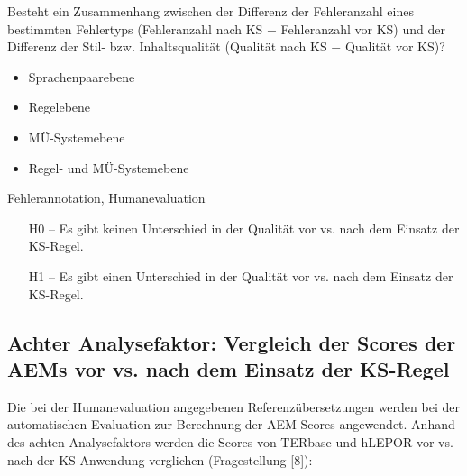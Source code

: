 \begin{description}[font=\normalfont\bfseries]
\item [Fragestellung] Besteht ein Zusammenhang zwischen der Differenz der Fehleranzahl eines bestimmten Fehlertyps (Fehleranzahl nach KS $-$ Fehleranzahl vor KS) und der Differenz der Stil- bzw. Inhaltsqualität (Qualität nach KS $-$ Qualität vor KS)?
\item [Analyseebene]\hfill
  \begin{itemize}
  \item Sprachenpaarebene
  \item Regelebene
  \item MÜ-Systemebene
  \item Regel- und MÜ-Systemebene
  \end{itemize}
\item [Analysemethode] Fehlerannotation, Humanevaluation
\item [Hypothesen]\hfill
  \begin{itemize}
  \item [H0] -- Es gibt keinen Unterschied in der Qualität vor vs. nach dem Einsatz der KS-Regel.
  \item [H1] -- Es gibt einen Unterschied in der Qualität vor vs. nach dem Einsatz der KS-Regel.
  \end{itemize}
\end{description}



\subsection*{Achter Analysefaktor: Vergleich der Scores der AEMs vor vs. nach dem Einsatz der KS-Regel}

Die bei der Humanevaluation angegebenen Referenzübersetzungen werden bei der automatischen Evaluation zur Berechnung der AEM-Scores angewendet. Anhand des achten Analysefaktors werden die Scores von TERbase und hLEPOR vor vs. nach der KS-Anwendung verglichen (Fragestellung [8]):

